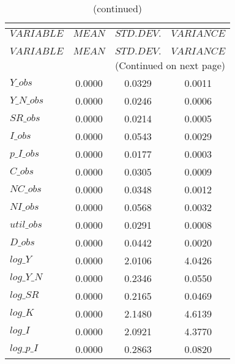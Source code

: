  
\begin{center}
\begin{longtable}{lccc} 
\caption{THEORETICAL MOMENTS}\\
 \label{Table:th_moments}\\
\toprule 
$VARIABLE   $	 & 	 $         MEAN$	 & 	 $    STD. DEV.$	 & 	 $     VARIANCE$\\
\midrule \endfirsthead 
\caption{(continued)}\\
 \toprule \\ 
$VARIABLE   $	 & 	 $         MEAN$	 & 	 $    STD. DEV.$	 & 	 $     VARIANCE$\\
\midrule \endhead 
\midrule \multicolumn{4}{r}{(Continued on next page)} \\ \bottomrule \endfoot 
\bottomrule \endlastfoot 
$Y\_obs     $	 & 	       0.0000	 & 	       0.0329	 & 	       0.0011 \\ 
$Y\_N\_obs  $	 & 	       0.0000	 & 	       0.0246	 & 	       0.0006 \\ 
$SR\_obs    $	 & 	       0.0000	 & 	       0.0214	 & 	       0.0005 \\ 
$I\_obs     $	 & 	       0.0000	 & 	       0.0543	 & 	       0.0029 \\ 
$p\_I\_obs  $	 & 	       0.0000	 & 	       0.0177	 & 	       0.0003 \\ 
$C\_obs     $	 & 	       0.0000	 & 	       0.0305	 & 	       0.0009 \\ 
$NC\_obs    $	 & 	       0.0000	 & 	       0.0348	 & 	       0.0012 \\ 
$NI\_obs    $	 & 	       0.0000	 & 	       0.0568	 & 	       0.0032 \\ 
$util\_obs  $	 & 	       0.0000	 & 	       0.0291	 & 	       0.0008 \\ 
$D\_obs     $	 & 	       0.0000	 & 	       0.0442	 & 	       0.0020 \\ 
$log\_Y     $	 & 	       0.0000	 & 	       2.0106	 & 	       4.0426 \\ 
$log\_Y\_N  $	 & 	       0.0000	 & 	       0.2346	 & 	       0.0550 \\ 
$log\_SR    $	 & 	       0.0000	 & 	       0.2165	 & 	       0.0469 \\ 
$log\_K     $	 & 	       0.0000	 & 	       2.1480	 & 	       4.6139 \\ 
$log\_I     $	 & 	       0.0000	 & 	       2.0921	 & 	       4.3770 \\ 
$log\_p\_I  $	 & 	       0.0000	 & 	       0.2863	 & 	       0.0820 \\ 

\end{longtable}
\end{center}
